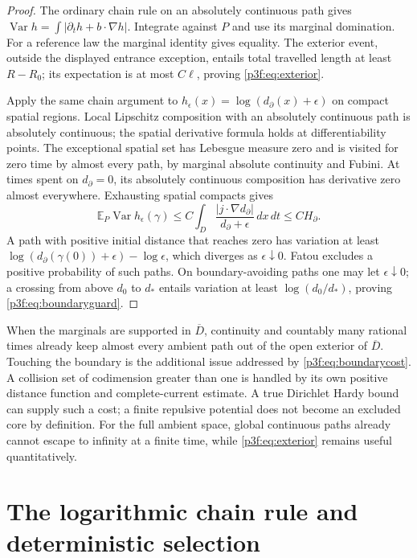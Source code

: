\documentclass[11pt]{article}
\numberwithin{equation}{section}
\theoremstyle{definition}
\theoremstyle{remark}
\begin{document}
\begin{proof}
The ordinary chain rule on an absolutely continuous path gives
$\operatorname{Var}h=\int|\partial_t h+b\cdot\nabla h|$.
Integrate against $P$ and use its marginal domination. For a reference
law the marginal identity gives equality. The exterior event, outside
the displayed entrance exception, entails total travelled length at
least $R-R_0$; its expectation is at most $C\ell$, proving
\eqref{p3f:eq:exterior}.

Apply the same chain argument to
$h_\epsilon(x)=\log(d_\partial(x)+\epsilon)$ on compact spatial
regions. Local Lipschitz composition with an absolutely continuous
path is absolutely continuous; the spatial derivative formula holds
at differentiability points. The exceptional spatial set has Lebesgue
measure zero and is visited for zero time by almost every path, by
marginal absolute continuity and Fubini. At times spent on
$d_\partial=0$, its absolutely continuous composition has derivative
zero almost everywhere. Exhausting spatial compacts gives
\[
 \mathbb E_P\operatorname{Var}h_\epsilon(\gamma)
 \leq C\int_D\frac{|j\cdot\nabla d_\partial|}
                         {d_\partial+\epsilon}\,dx\,dt
 \leq C H_\partial .
\]
A path with positive initial distance that reaches zero has variation
at least
$\log(d_\partial(\gamma(0))+\epsilon)-\log\epsilon$,
which diverges as $\epsilon\downarrow0$. Fatou excludes a positive
probability of such paths. On boundary-avoiding paths one may let
$\epsilon\downarrow0$; a crossing from above $d_0$ to $d_*$ entails
variation at least $\log(d_0/d_*)$, proving
\eqref{p3f:eq:boundaryguard}.
\end{proof}

When the marginals are supported in $\overline D$, continuity and
countably many rational times already keep almost every ambient path
out of the open exterior of $\overline D$. Touching the boundary is the
additional issue addressed by \eqref{p3f:eq:boundarycost}. A collision
set of codimension greater than one is handled by its own positive
distance function and complete-current estimate. A true Dirichlet
Hardy bound can supply such a cost; a finite repulsive potential does
not become an excluded core by definition. For the full ambient space,
global continuous paths already cannot escape to infinity at a finite
time, while \eqref{p3f:eq:exterior} remains useful quantitatively.

\section{The logarithmic chain rule and deterministic selection}
\label{p3f:sec:selection}
\end{document}
